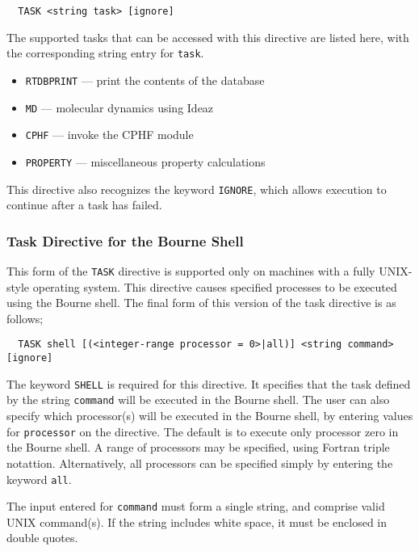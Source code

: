 \begin{itemize}
\begin{verbatim}
  TASK <string task> [ignore]
\end{verbatim}

The supported tasks that can be accessed with this directive are listed
here, with the corresponding string entry for \verb+task+.

\begin{itemize}
  \item \verb+RTDBPRINT+ --- print the contents of the database
  \item \verb+MD+ --- molecular dynamics using Ideaz
  \item \verb+CPHF+ --- invoke the CPHF module
  \item \verb+PROPERTY+ --- miscellaneous property calculations
\end{itemize}

This directive also recognizes the keyword \verb+IGNORE+, which allows
execution to continue after a task has failed.

\subsubsection{Task Directive for the Bourne Shell}

This form of the \verb+TASK+ directive is supported only on machines 
with a fully UNIX-style operating system.  This directive causes specified
processes to be executed using the Bourne shell.  The final form of this
version of the task directive is as follows;

\begin{verbatim}
  TASK shell [(<integer-range processor = 0>|all)] <string command> [ignore]
\end{verbatim}

The keyword \verb+SHELL+ is required for this directive.  It specifies
that the task defined by the string \verb+command+ will be executed in
the Bourne shell.  The user can also specify which processor(s) will be
executed in the Bourne shell, by entering values for \verb+processor+ on
the directive.  The default is to execute only processor zero in the 
Bourne shell.  A range of processors may be specified, using Fortran
triple notattion.  Alternatively, all processors can be specified simply
by entering the keyword
\verb+all+.

The input entered for \verb+command+ must form a single string, and comprise
valid UNIX command(s).  If the string includes white space, it must be 
enclosed in double quotes.


\end{itemize}
